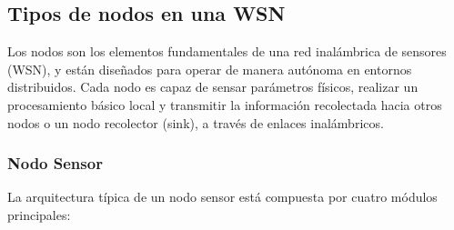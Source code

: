\subsection{Tipos de nodos en una WSN}

Los nodos son los elementos fundamentales de una red inalámbrica de sensores (WSN), y están diseñados para operar de manera autónoma en entornos distribuidos. Cada nodo es capaz de sensar parámetros físicos, realizar un procesamiento básico local y transmitir la información recolectada hacia otros nodos o un nodo recolector (sink), a través de enlaces inalámbricos.
\subsubsection*{Nodo Sensor}
La arquitectura típica de un nodo sensor está compuesta por cuatro módulos principales:

